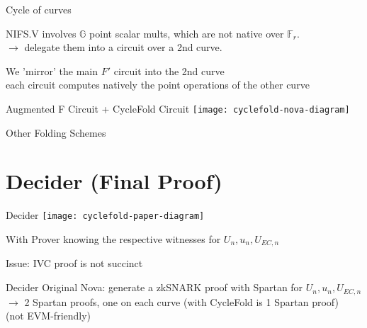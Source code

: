 \documentclass[t]{beamer}
\begin{document}
\begin{frame}{Cycle of curves}
  \small{
  NIFS.V involves $\mathbb{G}$ point scalar mults, which are not native over $\mathbb{F}_r$.
  \\$\longrightarrow$ delegate them into a circuit over a 2nd curve.

  \vspace{0.3cm}

  We 'mirror' the main $F'$ circuit into the 2nd curve\\
  each circuit computes natively the point operations of the other curve
  }

\end{frame}


\begin{frame}{Augmented F Circuit + CycleFold Circuit}
  \texttt{[image: cyclefold-nova-diagram]}
\end{frame}

\begin{frame}{Other Folding Schemes}
\end{frame}

\section{Decider (Final Proof)}

\begin{frame}{Decider}
  \texttt{[image: cyclefold-paper-diagram]}

  With Prover knowing the respective witnesses for $U_n, u_n, U_{EC,n}$

  \vspace{1cm}

  Issue: IVC proof is not succinct
\end{frame}

\begin{frame}{Decider}
  Original Nova: generate a zkSNARK proof with Spartan for $U_n, u_n, U_{EC, n}$\\
  $\longrightarrow$ 2 Spartan proofs, one on each curve (with CycleFold is 1 Spartan proof)\\
  (not EVM-friendly)


\end{frame}
\end{document}
